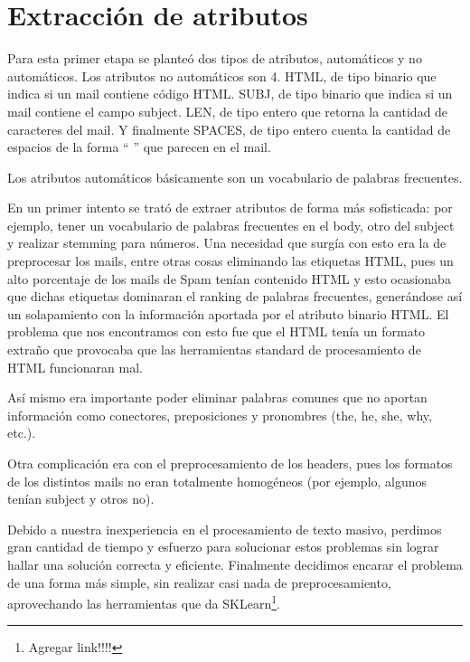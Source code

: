 \documentclass[hidelinks,a4paper,11pt, nofootinbib]{article}
\begin{document}
\maketitle


\section{Extracción de atributos}

Para esta primer etapa se planteó dos tipos de atributos, automáticos y no automáticos. Los atributos no automáticos son 4. HTML, de tipo binario que indica si un mail contiene código HTML. SUBJ, de tipo binario que indica si un mail contiene el campo subject. LEN, de tipo entero que retorna la cantidad de caracteres del mail. Y finalmente SPACES, de tipo entero cuenta la cantidad de espacios de la forma `` '' que parecen en el mail.

Los atributos automáticos básicamente son un vocabulario de palabras frecuentes.

En un primer intento se trató de extraer atributos de forma más sofisticada: por ejemplo, tener un vocabulario de palabras frecuentes en el body, otro del subject y realizar stemming para números. Una necesidad que surgía con esto era la de preprocesar los mails, entre otras cosas eliminando las etiquetas HTML, pues un alto porcentaje de los mails de Spam tenían contenido HTML y esto ocasionaba que dichas etiquetas dominaran el ranking de palabras frecuentes, generándose así un solapamiento con la información aportada por el atributo binario HTML. El problema que nos encontramos con esto fue que el HTML tenía un formato extraño que provocaba que las herramientas standard de procesamiento de HTML funcionaran mal.

Así mismo era importante poder eliminar palabras comunes que no aportan información como conectores, preposiciones y pronombres (the, he, she, why, etc.).

Otra complicación era con el preprocesamiento de los headers, pues los formatos de los distintos mails no eran totalmente homogéneos (por ejemplo, algunos tenían subject y otros no).

Debido a nuestra inexperiencia en el procesamiento de texto masivo, perdimos gran cantidad de tiempo y esfuerzo para solucionar estos problemas sin lograr hallar una solución correcta y eficiente. Finalmente decidimos encarar el problema de una forma más simple, sin realizar casi nada de preprocesamiento, aprovechando las herramientas que da SKLearn\footnote{Agregar link!!!!}.
\end{document}
